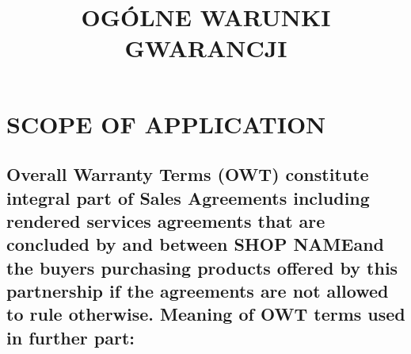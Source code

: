 \documentclass[10pt,a4paper]{article}
\title{OGÓLNE WARUNKI GWARANCJI} %
\author{}
\date{}
\newcommand{\shopname}{SHOP NAME}
\begin{document}
	\maketitle
 
	\section{SCOPE OF APPLICATION}
	
	\subsection {Overall Warranty Terms (OWT) constitute integral part of  Sales Agreements including rendered services agreements that are concluded by and between \shopname and the buyers purchasing products offered by this partnership if the agreements are not allowed to rule otherwise. Meaning of OWT terms used in further part:}
	
\end{document}
